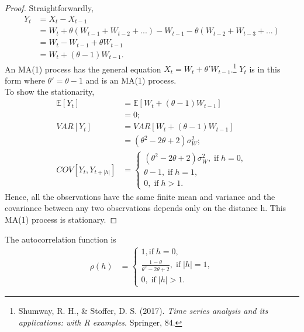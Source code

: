 \documentclass[10pt]{article}
\begin{document}
\begin{proof}
Straightforwardly,
\begin{align*}
Y_t&=X_t-X_{t-1}\\
&=W_t+\theta(W_{t-1}+W_{t-2}+...)-W_{t-1}-\theta(W_{t-2}+W_{t-3}+...)\\
&=W_t-W_{t-1}+{\theta}W_{t-1}\\
&=W_t+(\theta-1)W_{t-1}.
\end{align*}
An MA(1) process has the general equation $X_t=W_t+{\theta'}W_{t-1}$.\footnote{ Shumway, R. H., \& Stoffer, D. S. (2017). \textit{Time series analysis and its applications: with R examples}. Springer, 84.} $Y_t$ is in this form where $\theta'=\theta-1$ and is an MA(1) process.\\
To show the stationarity,
\begin{align*}
\mathbb{E}[Y_t]&=\mathbb{E}[W_t+(\theta-1)W_{t-1}]\\
&=0;\\
VAR[Y_t]&=VAR[W_t+(\theta-1)W_{t-1}]\\
&=(\theta^2-2\theta+2)\sigma^2_W;\\
COV[Y_t,Y_{t+|h|}]&=\left\{\begin{array}{ll}(\theta^2-2\theta+2)\sigma^2_W,\;\textrm{if}\;h=0,\\
\theta-1,\;\textrm{if}\;h=1,\\
0,\;\textrm{if}\;h>1.\end{array}\right.
\end{align*}
Hence, all the observations have the same finite mean and variance and the covariance between any two observations depends only on the distance h. This MA(1) process is stationary.
\end{proof}
The autocorrelation function is
\begin{align*}
\rho(h)&=\left\{\begin{array}{ll}1,\textrm{if}\;h=0,\\
\frac{1-\theta}{\theta^2-2\theta+2},\;\textrm{if}\;|h|=1,\\
0,\;\textrm{if}\;|h|>1.\end{array}\right.
\end{align*}
\vspace{3mm}
\end{document}
